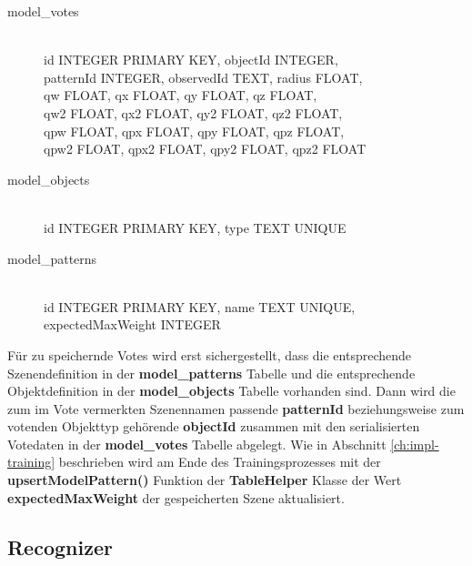 \begin{description}
  \item[model\_votes] \hfill \\
    id INTEGER PRIMARY KEY, objectId INTEGER,\\ patternId INTEGER, observedId TEXT, radius FLOAT,\\ qw FLOAT, qx FLOAT, qy FLOAT, qz FLOAT,\\ qw2 FLOAT, qx2 FLOAT, qy2 FLOAT, qz2 FLOAT,\\ qpw FLOAT, qpx FLOAT, qpy FLOAT, qpz FLOAT,\\ qpw2 FLOAT, qpx2 FLOAT, qpy2 FLOAT, qpz2 FLOAT
  \item[model\_objects] \hfill \\
    id INTEGER PRIMARY KEY, type TEXT UNIQUE
  \item[model\_patterns] \hfill \\
    id INTEGER PRIMARY KEY, name TEXT UNIQUE,\\ expectedMaxWeight INTEGER
\end{description}

Für zu speichernde Votes wird erst sichergestellt, dass die entsprechende Szenendefinition in der \textbf{model\_patterns} Tabelle und die entsprechende Objektdefinition in der \textbf{model\_objects} Tabelle vorhanden sind.
Dann wird die zum im Vote vermerkten Szenennamen passende \textbf{patternId} beziehungsweise zum votenden Objekttyp gehörende \textbf{objectId} zusammen mit den serialisierten Votedaten in der \textbf{model\_votes} Tabelle abgelegt.
Wie in Abschnitt \vref{ch:impl-training} beschrieben wird am Ende des Trainingsprozesses mit der \textbf{upsertModelPattern()} Funktion der \textbf{TableHelper} Klasse der Wert \textbf{expectedMaxWeight} der gespeicherten Szene aktualisiert.

\subsection{Recognizer}

